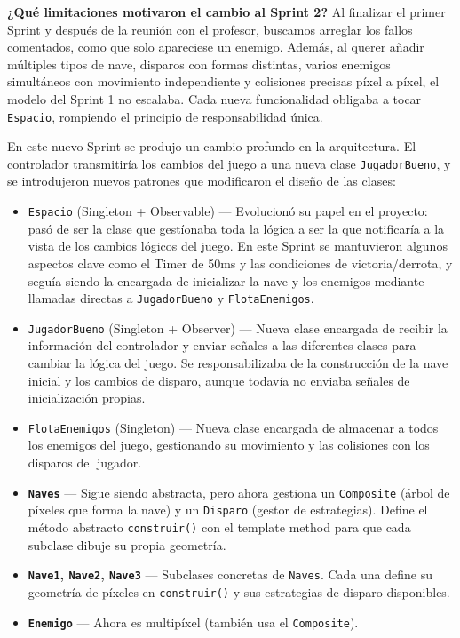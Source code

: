 \documentclass[12pt, a4paper]{article}
\begin{document}
\vspace{0.8em}
\textbf{¿Qu\'{e} limitaciones motivaron el cambio al Sprint 2?} Al finalizar el primer Sprint y despu\'{e}s de la reuni\'{o}n con el profesor, buscamos arreglar los fallos comentados, como que solo apareciese un enemigo. Adem\'{a}s, al querer a\~{n}adir m\'{u}ltiples tipos de nave, disparos con formas distintas, varios enemigos simult\'{a}neos con movimiento independiente y colisiones precisas p\'{i}xel a p\'{i}xel, el modelo del Sprint 1 no escalaba. Cada nueva funcionalidad obligaba a tocar \texttt{Espacio}, rompiendo el principio de responsabilidad \'{u}nica.
 
\vspace{0.5em}
 
\begin{cajasprint2}
En este nuevo Sprint se produjo un cambio profundo en la arquitectura. El controlador transmitir\'{i}a los cambios del juego a una nueva clase \texttt{JugadorBueno}, y se introdujeron nuevos patrones que modificaron el dise\~{n}o de las clases:
 
\begin{itemize}
    \item \texttt{Espacio} (Singleton + Observable) --- Evolucion\'{o} su papel en el proyecto: pas\'{o} de ser la clase que gest\'{i}onaba toda la l\'{o}gica a ser la que notificar\'{i}a a la vista de los cambios l\'{o}gicos del juego. En este Sprint se mantuvieron algunos aspectos clave como el Timer de 50ms y las condiciones de victoria/derrota, y segu\'{i}a siendo la encargada de inicializar la nave y los enemigos mediante llamadas directas a \texttt{JugadorBueno} y \texttt{FlotaEnemigos}.
    \item \texttt{JugadorBueno} (Singleton + Observer) --- Nueva clase encargada de recibir la informaci\'{o}n del controlador y enviar se\~{n}ales a las diferentes clases para cambiar la l\'{o}gica del juego. Se responsabilizaba de la construcci\'{o}n de la nave inicial y los cambios de disparo, aunque todav\'{i}a no enviaba se\~{n}ales de inicializaci\'{o}n propias.
    \item \texttt{FlotaEnemigos} (Singleton) --- Nueva clase encargada de almacenar a todos los enemigos del juego, gestionando su movimiento y las colisiones con los disparos del jugador.
    \item \textbf{\texttt{Naves}} --- Sigue siendo abstracta, pero ahora gestiona un \texttt{Composite} (\'{a}rbol de p\'{i}xeles que forma la nave) y un \texttt{Disparo} (gestor de estrategias). Define el m\'{e}todo abstracto \texttt{construir()} con el template method para que cada subclase dibuje su propia geometr\'{i}a.
    \item \textbf{\texttt{Nave1}, \texttt{Nave2}, \texttt{Nave3}} --- Subclases concretas de \texttt{Naves}. Cada una define su geometr\'{i}a de p\'{i}xeles en \texttt{construir()} y sus estrategias de disparo disponibles.
    \item \textbf{\texttt{Enemigo}} --- Ahora es multip\'{i}xel (tambi\'{e}n usa el \texttt{Composite}).
    
\end{itemize}
\end{cajasprint2}
 
\end{document}
